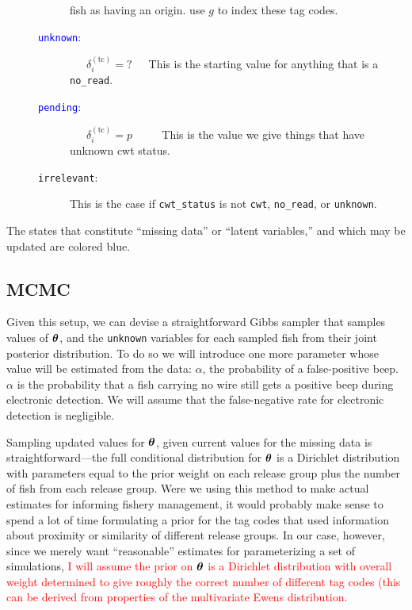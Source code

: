 \documentclass[11pt]{article}
\def\bm#1{\mathpalette\bmstyle{#1}}
\def\bmstyle#1#2{\mbox{\boldmath$#1#2$}}
\newcommand{\btheta}{\bm{\theta}}
\begin{document}
\begin{description}
\begin{description}
		fish as having an origin.
		use $g$ to index these tag codes.
		\item [\textcolor{blue}{{\tt unknown}}:] ~~~$\delta_i^{(\mathrm{tc})} = \mbox{?}$~~~This is the starting value
		for anything that is a {\tt no\_read}.
		\item [\textcolor{blue}{{\tt pending}}:] ~~~$\delta_i^{(\mathrm{tc})} = p$ ~~~~ This is the value we give things
		that have unknown cwt status.  
		\item [{\tt irrelevant}:] This is the case if {\tt cwt\_status} is not {\tt cwt}, {\tt no\_read}, or {\tt unknown}.  
	\end{description}
\end{description}


The states that constitute ``missing data'' or ``latent variables,'' and which may be updated
are colored blue.

\subsection{MCMC}

Given this setup, we can devise a straightforward Gibbs sampler that samples values of $\btheta$, and the 
{\tt unknown} variables for each sampled fish from their joint posterior distribution. To do so we will
introduce one more parameter whose value will be estimated from the data:  $\alpha$, the probability
of a false-positive beep.  $\alpha$ is the probability that a fish carrying no wire still gets a positive
beep during electronic detection.  We will assume that the false-negative rate for electronic detection is
negligible.

Sampling updated values for $\btheta$, given current values for the missing data is straightforward---the 
full conditional distribution for $\btheta$ is a Dirichlet distribution
with parameters equal to the prior weight on each
release group plus the number of fish from each release group.  Were we using this method to make actual estimates
for informing fishery management, it would probably make sense to spend a lot of time formulating a prior
for the tag codes that used information about proximity or similarity of different release groups. In our
case, however, since we merely want ``reasonable'' estimates for parameterizing a set of simulations, \textcolor{red}{I will assume
the prior on $\btheta$ is a Dirichlet distribution with overall weight determined to give roughly the correct
number of different tag codes (this can be derived from properties of the multivariate Ewens distribution.}
\end{document}
